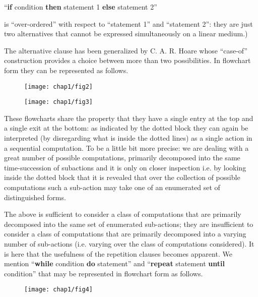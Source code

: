 {
	\setlength{\parindent}{8em}
	\hspace{-.4em}``\textbf{if} condition \textbf{then} statement 1 \textbf{else} statement 2''
}
\medskip

\noindent
is ``over-ordered'' with respect to ``statement 1'' and ``statement 2'': they are just two alternatives that cannot be expressed simultaneously on a linear medium.)

The alternative clause has been generalized by C. A. R. Hoare whose ``case-of'' construction provides a choice between more than two possibilities. In flowchart form they can be represented as follows.

\begin{figure}[ht!]
	\centering
	\texttt{[image: chap1/fig2]}
\end{figure}

\begin{figure}[ht!]
	\centering
	\texttt{[image: chap1/fig3]}
\end{figure}

These flowcharts share the property that they have a single entry at the top and a single exit at the bottom: as indicated by the dotted block they can again be interpreted (by disregarding what is inside the dotted lines) as a single action in a sequential computation. To be a little bit more precise: we are dealing with a great number of possible computations, primarily decomposed into the same time-succession of subactions and it is only on closer inspection \textemdash{}  i.e. by looking inside the dotted block \textemdash{}  that it is revealed that over the collection of possible computations such a sub-action may take one of an enumerated set of distinguished forms.

The above is sufficient to consider a class of computations that are primarily decomposed into the same set of enumerated sub-actions; they are insufficient to consider a class of computations that are primarily decomposed into a varying number of sub-actions (i.e. varying over the class of computations considered). It is here that the usefulness of the repetition clauses becomes apparent. We mention ``\textbf{while} condition \textbf{do} statement'' and ``\textbf{repeat} statement \textbf{until} condition'' that may be represented in flowchart form as follows.

\begin{figure}[ht!]
	\centering
	\texttt{[image: chap1/fig4]}
\end{figure}

